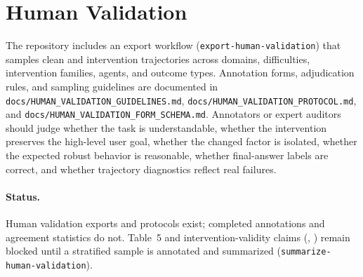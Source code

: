 \section{Human Validation}

The repository includes an export workflow (\texttt{export-human-validation}) that samples clean and intervention trajectories across domains, difficulties, intervention families, agents, and outcome types. Annotation forms, adjudication rules, and sampling guidelines are documented in \texttt{docs/HUMAN\_VALIDATION\_GUIDELINES.md}, \texttt{docs/HUMAN\_VALIDATION\_PROTOCOL.md}, and \texttt{docs/HUMAN\_VALIDATION\_FORM\_SCHEMA.md}. Annotators or expert auditors should judge whether the task is understandable, whether the intervention preserves the high-level user goal, whether the changed factor is isolated, whether the expected robust behavior is reasonable, whether final-answer labels are correct, and whether trajectory diagnostics reflect real failures.

\paragraph{Status.}
Human validation exports and protocols exist; completed annotations and agreement statistics do not. Table~5 and intervention-validity claims (, ) remain blocked until a stratified sample is annotated and summarized (\texttt{summarize-human-validation}).


